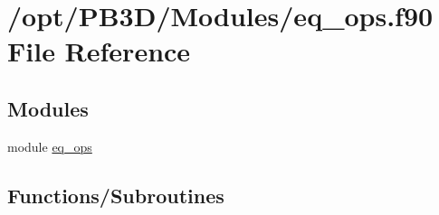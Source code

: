 \hypertarget{eq__ops_8f90}{}\section{/opt/\+P\+B3\+D/\+Modules/eq\+\_\+ops.f90 File Reference}
\label{eq__ops_8f90}
\subsection*{Modules}
\begin{DoxyCompactItemize}
\item 
module \hyperlink{namespaceeq__ops}{eq\+\_\+ops}
\end{DoxyCompactItemize}
\subsection*{Functions/\+Subroutines}
